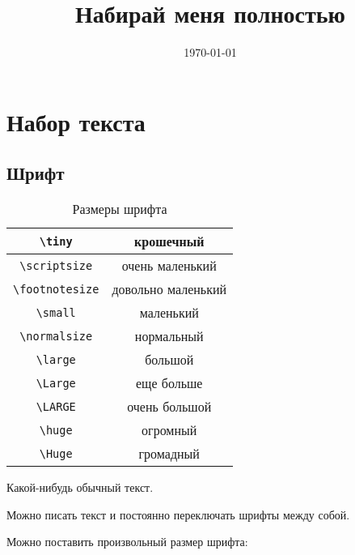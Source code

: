 \documentclass[12pt, a4paper]{article}
\title{Набирай меня полностью}
\date{\today}
\begin{document}

\maketitle

\section{Набор текста}

\subsection{Шрифт}

\begin{table}[h!]
	\caption{Размеры шрифта}
	\centering
		\begin{tabular}{|c|c|}
		\hline	\verb|\tiny|      & \tiny        крошечный \\
		\hline	\verb|\scriptsize|   & \scriptsize  очень маленький\\
			\hline \verb|\footnotesize| & \footnotesize  довольно маленький \\
			\hline \verb|\small|        &  \small        маленький \\
			\hline \verb|\normalsize|   &  \normalsize  нормальный \\
			\hline \verb|\large|        &  \large       большой \\
			\hline \verb|\Large|        &  \Large       еще больше \\[5pt]
			\hline \verb|\LARGE|        &  \LARGE       очень большой \\[5pt]
			\hline \verb|\huge|         &  \huge        огромный \\[5pt]
			\hline \verb|\Huge|         &  \Huge        громадный \\ \hline
		\end{tabular}
\end{table}

\begin{Huge}
Какой-нибудь обычный текст.
\end{Huge}

\vspace{1cm}

Можно писать текст и \LARGE постоянно переключать \tiny шрифты между \normalsize собой.

\vspace{1cm}

Можно поставить произвольный размер шрифта:
\end{document}
